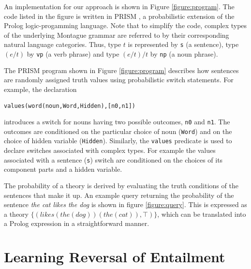 \documentclass[11pt]{article}
\theoremstyle{definition}
\newcommand{\hide}[1]{}
\begin{document}
An implementation for our approach is shown in Figure 
\ref{figure:program}. The code listed in the figure is written in PRISM \cite{Sato:97}, a probabilistic extension of the Prolog logic-progamming language. Note that to simplify the code, complex types of the underlying Montague grammar are referred to by their corresponding natural language
categories. Thus, type $t$ is represented by \texttt{s} (a sentence), type $(e/t)$ by \texttt{vp} (a verb phrase) and type $(e/t)/t$ by \texttt{np} (a noun phrase). 
\hide{
The PRISM language augments Prolog with probabilistic predicates and declarations. In particular, it incorporates random switches. The predicate \texttt{values} is used to declare a named switch and associate with it a number of possible outcomes while the probabilistic predicate \texttt{msw} allows a random choice to made amongst these outcomes during execution. 
}
The PRISM program shown in Figure \ref{figure:program} describes how sentences are randomly assigned truth values using probabilistic switch statements. For example, the declaration 
\begin{center}
\texttt{values(word(noun,Word,Hidden),[n0,n1])} 
\end{center}
introduces a switch for nouns having two possible outcomes, \texttt{n0} and \texttt{n1}.
The outcomes are conditioned on the particular choice of noun (\texttt{Word}) and on the choice of hidden variable (\texttt{Hidden}). Similarly, the \texttt{values} predicate is used to declare switches associated with complex types. For example the values associated with a sentence (\texttt{s}) switch are conditioned on the choices of its component parts and a hidden variable.

The probability of a theory is derived by evaluating the truth
conditions of the sentences that make it up.\hide{Note that probability
distributions are defined over models, not theories, so that to
evaluate the probability of a theory it is necessary to sum over the
probabilities of all of its satisfying models. To achieve this, the
predicate \texttt{prob} is used.} An example query returning the
probability of the sentence {\em the cat likes the dog\/} is shown in
figure \ref{figure:query}. This is expressed as a theory
$\{(\mathit{likes}(\mathit{the}(\mathit{dog}))(\mathit{the}(\mathit{cat})),\top)\}$,
which can be translated into a Prolog expression in a straightforward
manner.




\section{Learning Reversal of Entailment}
\end{document}
